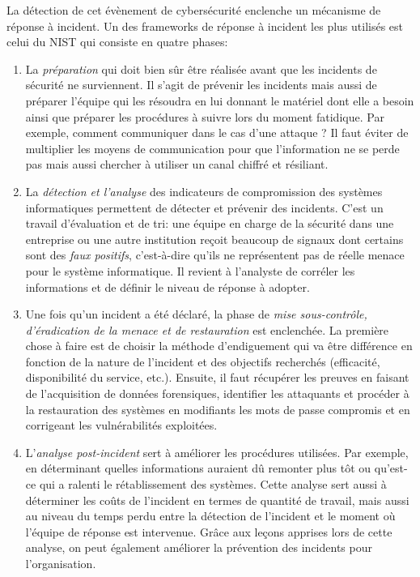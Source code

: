 La détection de cet évènement de cybersécurité enclenche un mécanisme de réponse à incident. Un des frameworks de réponse à incident les plus utilisés est celui du NIST qui consiste en quatre phases: \cite{2}
\begin{enumerate}
    \item La \textit{préparation} qui doit bien sûr être réalisée avant que les incidents de sécurité ne surviennent. Il s'agit de prévenir les incidents mais aussi de préparer l'équipe qui les résoudra en lui donnant le matériel dont elle a besoin ainsi que préparer les procédures à suivre lors du moment fatidique. Par exemple, comment communiquer dans le cas d'une attaque ? Il faut éviter de multiplier les moyens de communication pour que l'information ne se perde pas mais aussi chercher à utiliser un canal chiffré et résiliant.
    \item La \textit{détection et l'analyse} des indicateurs de compromission des systèmes informatiques permettent de détecter et prévenir des incidents. C'est un travail d'évaluation et de tri: une équipe en charge de la sécurité dans une entreprise ou une autre institution reçoit beaucoup de signaux dont certains sont des \textit{faux positifs}, c'est-à-dire qu'ils ne représentent pas de réelle menace pour le système informatique. Il revient à l'analyste de corréler les informations et de définir le niveau de réponse à adopter.
    \item Une fois qu'un incident a été déclaré, la phase de \textit{mise sous-contrôle, d'éradication de la menace et de restauration} est enclenchée. La première chose à faire est de choisir la méthode d'endiguement qui va être différence en fonction de la nature de l'incident et des objectifs recherchés (efficacité, disponibilité du service, etc.). Ensuite, il faut récupérer les preuves en faisant de l'acquisition de données forensiques, identifier les attaquants et procéder à la restauration des systèmes en modifiants les mots de passe compromis et en corrigeant les vulnérabilités exploitées.
    \item L'\textit{analyse post-incident} sert à améliorer les procédures utilisées. Par exemple, en déterminant quelles informations auraient dû remonter plus tôt ou qu'est-ce qui a ralenti le rétablissement des systèmes. Cette analyse sert aussi à déterminer les coûts de l'incident en termes de quantité de travail, mais aussi au niveau du temps perdu entre la détection de l'incident et le moment où l'équipe de réponse est intervenue. Grâce aux leçons apprises lors de cette analyse, on peut également améliorer la prévention des incidents pour l'organisation.
\end{enumerate}

